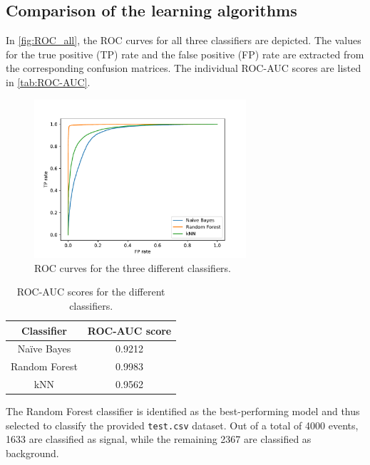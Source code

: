 \subsection{Comparison of the learning algorithms}
In \autoref{fig:ROC_all}, the ROC curves for all three classifiers are depicted. The values for the true positive (TP) rate and the false positive (FP) rate are
extracted from the corresponding confusion matrices. The individual ROC-AUC scores are listed in \autoref{tab:ROC-AUC}.
\begin{figure}[H]
    \centering
    \includegraphics[width=0.7\textwidth]{content/plots/ROC_all.pdf}
    \caption{ROC curves for the three different classifiers.}
    \label{fig:ROC_all}
\end{figure}
\begin{table}[H]
    \centering
    \caption{ROC-AUC scores for the different classifiers.}
    \label{tab:ROC-AUC}
      \begin{tabular}{c S}
        \toprule
        {Classifier} & {ROC-AUC score} \\
        \midrule
        {Na\"ive Bayes}   & 0.9212 \\
        {Random Forest} & 0.9983 \\
        {kNN}           & 0.9562 \\
        \bottomrule 
      \end{tabular} 
  \end{table}

  The Random Forest classifier is identified as the best-performing model and thus selected to classify the 
  provided \texttt{test.csv} dataset. Out of a total of 4000 events, 1633 are classified as signal, while the remaining 2367 
  are classified as background.
